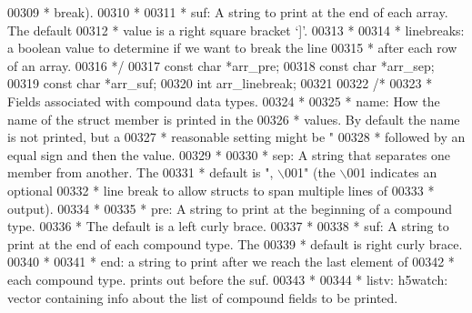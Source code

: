 \begin{DoxyCode}
{{{{{{{{{{{{{00309 \textcolor{comment}{     *              break).}
00310 \textcolor{comment}{     *}
00311 \textcolor{comment}{     *   suf:       A string to print at the end of each array.  The default}
00312 \textcolor{comment}{     *              value is a right square bracket `]'.}
00313 \textcolor{comment}{     *}
00314 \textcolor{comment}{     *   linebreaks: a boolean value to determine if we want to break the line}
00315 \textcolor{comment}{     *               after each row of an array.}
00316 \textcolor{comment}{     */}
00317     \textcolor{keyword}{const} \textcolor{keywordtype}{char}  *arr\_pre;
00318     \textcolor{keyword}{const} \textcolor{keywordtype}{char}  *arr\_sep;
00319     \textcolor{keyword}{const} \textcolor{keywordtype}{char}  *arr\_suf;
00320     \textcolor{keywordtype}{int}         arr\_linebreak;
00321 
00322     \textcolor{comment}{/*}
00323 \textcolor{comment}{     * Fields associated with compound data types.}
00324 \textcolor{comment}{     *}
00325 \textcolor{comment}{     *   name:      How the name of the struct member is printed in the}
00326 \textcolor{comment}{     *              values. By default the name is not printed, but a}
00327 \textcolor{comment}{     *              reasonable setting might be "%
00328 \textcolor{comment}{     *              followed by an equal sign and then the value.}
00329 \textcolor{comment}{     *}
00330 \textcolor{comment}{     *   sep:       A string that separates one member from another.  The}
00331 \textcolor{comment}{     *              default is ", \(\backslash\)001" (the \(\backslash\)001 indicates an optional}
00332 \textcolor{comment}{     *              line break to allow structs to span multiple lines of}
00333 \textcolor{comment}{     *              output).}
00334 \textcolor{comment}{     *}
00335 \textcolor{comment}{     *   pre:       A string to print at the beginning of a compound type.}
00336 \textcolor{comment}{     *              The default is a left curly brace.}
00337 \textcolor{comment}{     *}
00338 \textcolor{comment}{     *   suf:       A string to print at the end of each compound type.  The}
00339 \textcolor{comment}{     *              default is  right curly brace.}
00340 \textcolor{comment}{     *}
00341 \textcolor{comment}{     *   end:       a string to print after we reach the last element of}
00342 \textcolor{comment}{     *              each compound type. prints out before the suf.}
00343 \textcolor{comment}{     *}
00344 \textcolor{comment}{     *   listv:    h5watch: vector containing info about the list of compound fields to be printed.}
}}}}}}}}}}}}}}
\end{DoxyCode}
